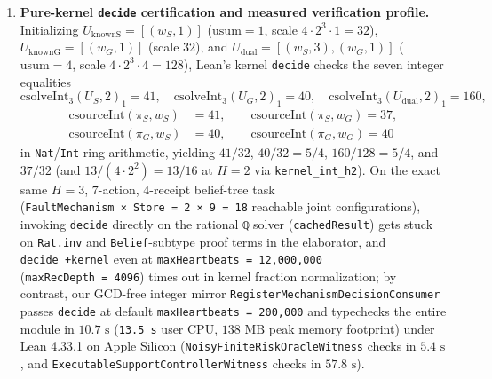 \documentclass[11pt,a4paper]{article}
\begin{document}
\begin{enumerate}
  and tie-breaking order (\texttt{cselectScored\_map}).
\item
  \textbf{Pure-kernel \texttt{decide} certification and measured
  verification profile.} Initializing
  \(U_{\mathrm{knownS}} = [(w_S, 1)]\) (\(\mathrm{usum} = 1\), scale
  \(4 \cdot 2^3 \cdot 1 = 32\)), \(U_{\mathrm{knownG}} = [(w_G, 1)]\)
  (scale \(32\)), and \(U_{\mathrm{dual}} = [(w_S, 3), (w_G, 1)]\)
  (\(\mathrm{usum} = 4\), scale \(4 \cdot 2^3 \cdot 4 = 128\)), Lean's
  kernel \texttt{decide} checks the seven integer equalities
  \[\mathrm{csolveInt}_3(U_S, 2)_1 = 41,\quad \mathrm{csolveInt}_3(U_G, 2)_1 = 40,\quad \mathrm{csolveInt}_3(U_{\mathrm{dual}}, 2)_1 = 160,\]
  \[\begin{aligned}
  \mathrm{csourceInt}(\pi_S, w_S) &= 41, \qquad \mathrm{csourceInt}(\pi_S, w_G) = 37, \\
  \mathrm{csourceInt}(\pi_G, w_S) &= 40, \qquad \mathrm{csourceInt}(\pi_G, w_G) = 40
  \end{aligned}\] in \texttt{Nat}/\texttt{Int} ring arithmetic, yielding
  \(41/32\), \(40/32 = 5/4\), \(160/128 = 5/4\), and \(37/32\) (and
  \(13 / (4 \cdot 2^2) = 13/16\) at \(H=2\) via
  \texttt{kernel\_int\_h2}). On the exact same \(H=3\), \(7\)-action,
  \(4\)-receipt belief-tree task
  (\texttt{\textbar{}FaultMechanism\ ×\ Store\textbar{}\ =\ 2\ ×\ 9\ =\ 18}
  reachable joint configurations), invoking \texttt{decide} directly on
  the rational \texttt{ℚ} solver (\texttt{cachedResult}) gets stuck on
  \texttt{Rat.inv} and \texttt{Belief}-subtype proof terms in the
  elaborator, and \texttt{decide\ +kernel} even at
  \texttt{maxHeartbeats\ =\ 12,000,000} (\texttt{maxRecDepth\ =\ 4096})
  times out in kernel fraction normalization; by contrast, our GCD-free
  integer mirror \texttt{RegisterMechanismDecisionConsumer} passes
  \texttt{decide} at default \texttt{maxHeartbeats\ =\ 200,000} and
  typechecks the entire module in \textbf{\(10.7\text{ s}\)}
  (\texttt{13.5\ s} user CPU, \textbf{\(138\text{ MB}\)} peak memory
  footprint) under Lean 4.33.1 on Apple Silicon
  (\texttt{NoisyFiniteRiskOracleWitness} checks in
  \textbf{\(5.4\text{ s}\)}, and
  \texttt{ExecutableSupportControllerWitness} checks in
  \textbf{\(57.8\text{ s}\)}).
\end{enumerate}

\end{document}
